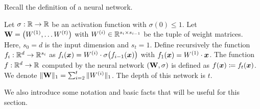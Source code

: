 Recall the definition of a neural network. 
\begin{definition}
    \label{def:Neural Network}
    Let $\sigma:\mathbb{R}\to\mathbb{R}$ be an activation function with $\sigma(0)\leq 1$. Let $\mathbf{W}=\left(W^{(1)},\ldots W^{(t)}\right)$ with $W^{(i)}\in \mathbb{R}^{s_i\times s_{i-1}}$ be the tuple of weight matrices. Here, $s_0=d$ is the input dimension and $s_{t}=1$. Define recursively the function $f_i:\mathbb{R}^{d}\to \mathbb{R}^{s_i}$ as $f_i({\bm{x}})=W^{(i)}\cdot \sigma\bigl(f_{i-1}({\bm{x}})\bigr)$ with $f_1({\bm{x}})=W^{(1)}\cdot{\bm{x}}$. The function $f:\mathbb{R}^d \to \mathbb{R}$ computed by the neural network $(\mathbf{W},\sigma)$ is defined as $f({\bm{x}})\coloneq f_{t}({\bm{x}})$. We denote $\|\mathbf{W}\|_1=\sum_{i=2}^{t}\|W^{(i)}\|_1$. The depth of this network is $t$. 
\end{definition}

We also introduce some notation and basic facts that will be useful for this section.

